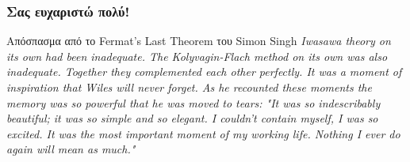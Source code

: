 \documentclass{beamer}
\newcommand {\tl}{\textlatin}
\begin{document}

\begin{frame}
\frametitle{Σας ευχαριστώ πολύ!}
\begin{block}{Απόσπασμα από το \tl{Fermat's Last Theorem} του \tl{Simon Singh}}
{\em Iwasawa theory on its own had been inadequate. The Kolyvagin-Flach method on its own was also inadequate. Together they complemented each other perfectly. It was a moment of inspiration that Wiles will never forget. As he recounted these moments the memory was so powerful that he was moved to tears: "It was so indescribably beautiful; it was so simple and so elegant. I couldn't contain myself, I was so excited. It was the most important moment of my working life. Nothing I ever do again will mean as much."}
\end{block}
\end{frame}
\end{document}
